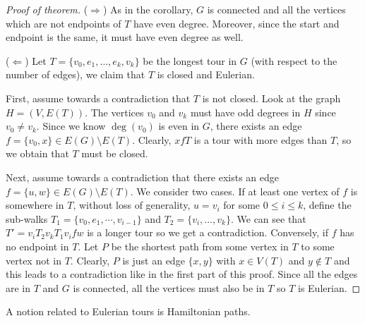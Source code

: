 \documentclass{tufte-handout}
\theoremstyle{definition}
\theoremstyle{remark}
\begin{document}
\begin{proof}[Proof of theorem]
	($\Rightarrow$) As in the corollary, $G$ is connected and all the vertices which are not endpoints of $T$ have even degree. Moreover, since the start and endpoint is the same, it must have even degree as well.
	
	($\Leftarrow$) Let $T = \{v_0, e_1, \dots, e_k,v_k\}$ be the longest tour in $G$ (with respect to the number of edges), we claim that $T$ is closed and Eulerian.
	
	First, assume towards a contradiction that $T$ is not closed. Look at the graph $H=(V,E(T))$. The vertices $v_0$ and $v_k$ must have odd degrees in $H$ since $v_0 \neq v_k$. Since we know $\deg(v_0)$ is even in $G$, there exists an edge $f =\{v_0,x\} \in E(G)\setminus E(T)$. Clearly, $xfT$ is a tour with more edges than $T$, so we obtain that $T$ must be closed. 
	
	Next, assume towards a contradiction that there exists an edge $f=\{u,w\} \in E(G)\setminus E(T)$. We consider two cases. If at least one vertex of $f$ is somewhere in $T$, without loss of generality, $u = v_i$ for some $0 \leq i \leq k$, define the sub-walks $T_1 = \{v_0, e_1, \cdots, v_{i-1}\}$ and $T_2 = \{v_i, \dots, v_k\}$. We can see that $T' = v_iT_2v_kT_1v_ifw$ is a longer tour so we get a contradiction. Conversely, if $f$ has no endpoint in $T$. Let $P$ be the shortest path from some vertex in $T$ to some vertex not in $T$. Clearly, $P$ is just an edge $\{x,y\}$ with $x \in V(T)$ and $y \notin T$ and this leads to a contradiction like in the first part of this proof. Since all the edges are in $T$ and $G$ is connected, all the vertices must also be in $T$ so $T$ is Eulerian.
\end{proof}

A notion related to Eulerian tours is Hamiltonian paths.
\end{document}
